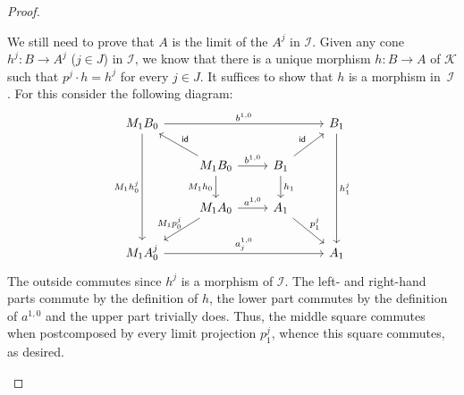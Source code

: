 \documentclass[sigconf,
			final%
			nonacm
                        ]{acmart}
\numberwithin{equation}{section}
\numberwithin{equation}{section}
\theoremstyle{plain}
\theoremstyle{definition}
\newcommand{\id}{\mathsf{id}}
\newcommand{\CatK}{\mathscr{K}}
\newcommand{\CatI}{\mathscr{I}}
\begin{document}
\begin{proof}
\begin{enumerate}
    We still need to prove that $A$ is the limit of the $A^j$ in
    $\CatI$. Given any cone $h^j\colon B \to A^j$ ($j \in J$) in
    $\CatI$, we know that there is a unique morphism $h\colon B \to A$
    of $\CatK$ such that $p^j \cdot h = h^j$ for every $j \in J$. It
    suffices to show that $h$ is a morphism in~$\CatI$. For this
    consider the following diagram:
    \[
      \begin{tikzcd}
        M_1B_0
        \ar{rrr}{b^{1,0}}
        \ar{ddd}[swap]{M_1h^j_0}
        &&&
        B_1
        \ar{ddd}{h^j_1}
        \\
        &
        M_1B_0
        \ar{r}{b^{1,0}}
        \ar{d}[swap]{M_1h_0}
        \ar{lu}[swap]{\id}
        &
        B_1
        \ar{d}{h_1}
        \ar{ru}{\id}
        \\
        &
        M_1A_0
        \ar{r}{a^{1,0}}
        \ar{ld}[swap,inner sep =0]{M_1p^j_0}
        &
        A_1
        \ar{rd}[inner sep =1]{p^j_1}
        \\
        M_1A^j_0
        \ar{rrr}{a^{1,0}_j}
        &&&
        A_1
      \end{tikzcd}
    \]
    The outside commutes since $h^j$ is a morphism of $\CatI$. The
    left- and right-hand parts commute by the definition of $h$, the
    lower part commutes by the definition of $a^{1,0}$ and the upper
    part trivially does. Thus, the middle square commutes when
    postcomposed by every limit projection $p^j_1$, whence this square
    commutes, as desired.


\end{enumerate}
\end{proof}
\end{document}
